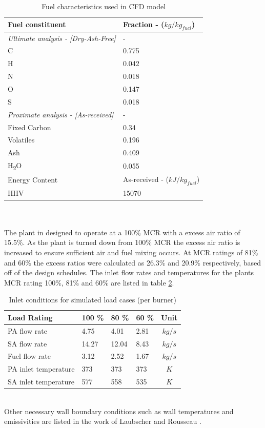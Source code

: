 \documentclass{webofc}
\begin{document}
\begin{table}[h!]
\centering
\caption{Fuel characteristics used in CFD model} \label{tab_fuel}
\begin{tabular}{ll}
\hline
Fuel constituent & Fraction - ($kg/kg_{fuel}$)   \\
\hline
\textit{Ultimate analysis - [Dry-Ash-Free]} & -  \\
C & 0.775 \\
H & 0.042 \\
N & 0.018 \\
O & 0.147 \\
S & 0.018 \\
\textit{Proximate analysis - [As-received]} & -\\
Fixed Carbon & 0.34\\
Volatiles & 0.196\\
Ash & 0.409\\
H\textsubscript{2}O & 0.055\\
\hline
Energy Content & As-received - ($kJ/kg_{fuel}$)\\
\hline
HHV & 15070 \\
\hline
\end{tabular}
\end{table}\\
\\
The plant in designed to operate at a 100\% MCR with a excess air ratio of 15.5\%. As the plant is turned down from 100\% MCR the excess air ratio is increased to ensure sufficient air and fuel mixing occurs. At MCR ratings of 81\% and 60\% the excess ratios were calculated as 26.3\% and 20.9\% respectively, based off of the design schedules. The inlet flow rates and temperatures for the plants MCR rating 100\%, 81\% and 60\% are listed in table \ref{tab_inlets}.\\
\begin{table}[h!]
\centering
\caption{Inlet conditions for simulated load cases (per burner)}\label{tab_inlets}       
\begin{tabular}{llllc}
\hline
Load Rating & 100 \% & 80 \% & 60 \% & Unit  \\
\hline
PA flow rate & 4.75 & 4.01 & 2.81 & $kg/s$   \\
SA flow rate & 14.27 & 12.04 & 8.43 & $kg/s$ \\
Fuel flow rate & 3.12 & 2.52 & 1.67 & $kg/s$ \\
PA inlet temperature & 373 & 373 & 373 & $K$ \\
SA inlet temperature & 577 &558 & 535 & $K$  \\
\hline
\end{tabular}
\end{table}\\
Other necessary wall boundary conditions such as wall temperatures and emissivities are listed in the work of Laubscher and Rousseau \cite{laubscher_1}.
\end{document}
